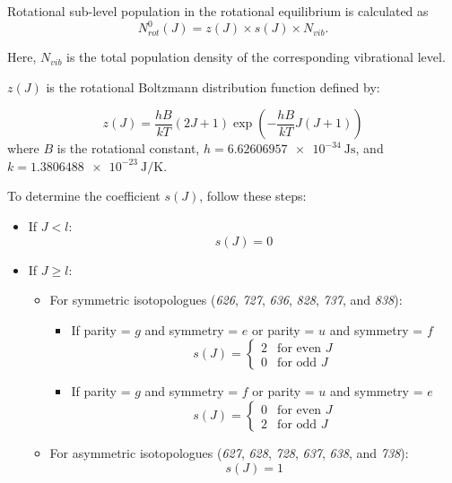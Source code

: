 Rotational sub-level population in the rotational equilibrium is calculated as
\begin{equation}
N_{rot}^0(J) = z(J) \times s(J) \times N_{vib}.
\end{equation}

Here, \( N_{vib} \) is the total population density of the corresponding vibrational level.

$z(J)$ is the rotational Boltzmann distribution function defined by:

\begin{equation}\label{eq:z}
z(J) = \frac{hB}{kT}(2J+1)\exp \left(-\frac{hB}{kT}J(J+1)\right)
\end{equation}
where $B$ is the rotational constant, $h = \SI{6.62606957e-34}{\joule\second}$, and $k = \SI{1.3806488e-23}{\joule\per\kelvin}$.

To determine the coefficient \( s(J) \), follow these steps:

\begin{itemize}
    \item If \( J < l \):
    \[s(J) = 0\]

    \item If \( J \geq l \):
    \begin{itemize}
        \item For symmetric isotopologues (\textit{626}, \textit{727}, \textit{636}, \textit{828}, \textit{737}, and \textit{838}):
        \begin{itemize}
            \item If parity = \(g\) and symmetry = \(e\) \quad or \quad  parity = \(u\) and symmetry = \(f\)
            \[
            s(J) = \begin{cases}
            2 & \text{for even } J \\
            0 & \text{for odd } J
            \end{cases}
            \]
            \item If parity = \(g\) and symmetry = \(f\) \quad or \quad  parity = \(u\) and symmetry = \(e\)
            \[
            s(J) = \begin{cases}
            0 & \text{for even } J \\
            2 & \text{for odd } J
            \end{cases}
            \]
        \end{itemize}

        \item For asymmetric isotopologues (\textit{627}, \textit{628}, \textit{728}, \textit{637}, \textit{638}, and \textit{738}):
        \[s(J) = 1\]
    \end{itemize}
\end{itemize}

